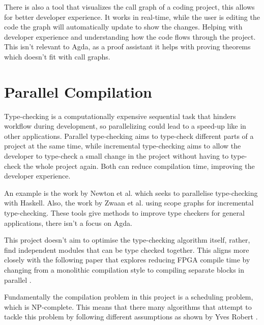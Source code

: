There is also a tool \cite{call_graph_vis} that visualizes the call graph of a
coding project, this allows for better developer experience. It works in
real-time, while the user is editing the code the graph will automatically
update to show the changes. Helping with developer experience and understanding
how the code flows through the project. This isn't relevant to Agda, as a proof
assistant it helps with proving theorems which doesn't fit with call graphs.

\section{Parallel Compilation}



Type-checking is a computationally expensive sequential task that hinders
workflow during development, so parallelizing could lead to a speed-up like in
other applications. Parallel type-checking aims to type-check different parts
of a project at the same time, while incremental type-checking aims to allow
the developer to type-check a small change in the project without having to
type-check the whole project again. Both can reduce compilation time, improving
the developer experience.

An example is the work by Newton et al. \cite{paralele_comp_haskell} which
seeks to parallelise type-checking with Haskell. Also, the work by Zwaan et al.
\cite{incremental_type_checking} using scope graphs for incremental
type-checking. These tools give methods to improve type checkers for general
applications, there isn't a focus on Agda.

This project doesn't aim to optimise the type-checking algorithm
itself, rather, find independent modules that can be type checked together.
This aligns more closely with the following paper that explores reducing FPGA
compile time by changing from a monolithic compilation style to compiling
separate blocks in parallel \cite{FPGA}.


Fundamentally the compilation problem in this project is a scheduling problem,
which is NP-complete\cite{scheduling}. This means that there many algorithms
that attempt to tackle this problem by following different assumptions as shown
by Yves Robert \cite{scheduling}.

